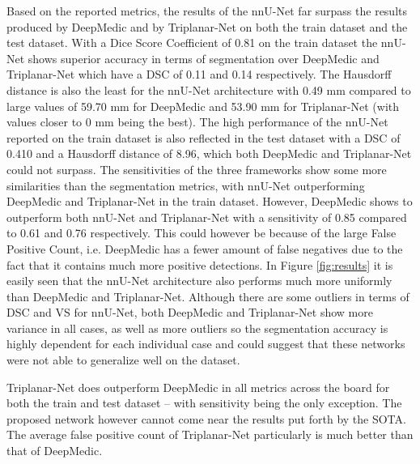 Based on the reported metrics, the results of the nnU-Net far surpass the results produced by DeepMedic and by Triplanar-Net on both the train dataset and the test dataset. With a Dice Score Coefficient of 0.81 on the train dataset the nnU-Net shows superior accuracy in terms of segmentation over DeepMedic and Triplanar-Net which have a DSC of 0.11 and 0.14 respectively. The Hausdorff distance is also the least for the nnU-Net architecture with 0.49 mm compared to large values of 59.70 mm for DeepMedic and 53.90 mm for Triplanar-Net (with values closer to 0 mm being the best). The high performance of the nnU-Net reported on the train dataset is also reflected in the test dataset with a DSC of 0.410 and a Hausdorff distance of 8.96, which both DeepMedic and Triplanar-Net could not surpass. The sensitivities of the three frameworks show some more similarities than the segmentation metrics, with nnU-Net outperforming DeepMedic and Triplanar-Net in the train dataset. However, DeepMedic shows to outperform both nnU-Net and Triplanar-Net with a sensitivity of 0.85 compared to 0.61 and 0.76 respectively. This could however be because of the large False Positive Count, i.e. DeepMedic has a fewer amount of false negatives due to the fact that it contains much more positive detections. In Figure \ref{fig:results} it is easily seen that the nnU-Net architecture also performs much more uniformly than DeepMedic and Triplanar-Net. Although there are some outliers in terms of DSC and VS for nnU-Net, both DeepMedic and Triplanar-Net show more variance in all cases, as well as more outliers so the segmentation accuracy is highly dependent for each individual case and could suggest that these networks were not able to generalize well on the dataset.

Triplanar-Net does outperform DeepMedic in all metrics across the board for both the train and test dataset -- with sensitivity being the only exception. The proposed network however cannot come near the results put forth by the SOTA. The average false positive count of Triplanar-Net particularly is much better than that of DeepMedic. 

